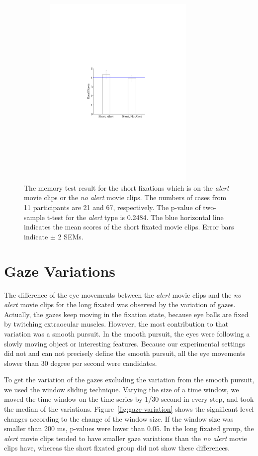 \documentclass[oneside,master]{snueethesis}
\begin{document}
\begin{figure}
  \centerline{\includegraphics[width=100mm,height=94mm,trim=54mm 90mm 54mm 90mm]{./eps/memtest_short.pdf}}
  \caption[The memory test result for the short fixations which are on the alert movie clips or no alert movie clips]{The memory test result for the short fixations which is on the \textit{alert} movie clips or the \textit{no alert} movie clips. The numbers of cases from 11 participants are 21 and 67, respectively. The p-value of two-sample t-test for the \textit{alert} type is 0.2484. The blue horizontal line indicates the mean scores of the short fixated movie clips. Error bars indicate $\pm$ 2 SEMs.}
  \label{fig:memtest-short}
\end{figure}


\section{Gaze Variations}
\label{subsec:gaze-variations}

The difference of the eye movements between the \textit{alert} movie clips and the \textit{no alert} movie clips for the long fixated was observed by the variation of gazes. Actually, the gazes keep moving in the fixation state, because eye balls are fixed by twitching extraocular muscles. However, the most contribution to that variation was a smooth pursuit. In the smooth pursuit, the eyes were following a slowly moving object or interesting features. Because our experimental settings did not and can not precisely define the smooth pursuit, all the eye movements slower than 30 degree per second were candidates. 

To get the variation of the gazes excluding the variation from the smooth pursuit, we used the window sliding technique. Varying the size of a time window, we moved the time window on the time series by 1/30 second in every step, and took the median of the variations. Figure~\ref{fig:gaze-variation} shows the significant level changes according to the change of the window size. If the window size was smaller than 200 ms, p-values were lower than 0.05. In the long fixated group, the \textit{alert} movie clips tended to have smaller gaze variations than the \textit{no alert} movie clips have, whereas the short fixated group did not show these differences.
\end{document}
